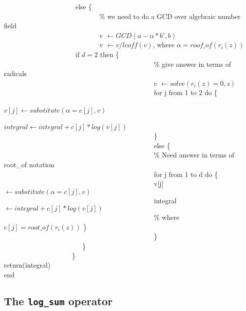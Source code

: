 \begin{flushleft}
~~~~~~~~~~~~~~~~~~~~~else \{ \\
~~~~~~~~~~~~~~~~~~~~~~~~~~~~\%  we need to do a GCD over algebraic number field \\
~~~~~~~~~~~~~~~~~~~~~~~~~~~~v $\leftarrow GCD(a-\alpha*b',b)$ \\
~~~~~~~~~~~~~~~~~~~~~~~~~~~~v $\leftarrow v/lcoff(v) $, \hspace{3 mm}
 where $\alpha=roof\_of(r_{i}(z))$ \\
~~~~~~~~~~~~~~~~~~~~~if $d=2$ then \{ \\
~~~~~~~~~~~~~~~~~~~~~~~~~~~~~~~~~~~~~~~~~~~~\% give answer in terms of radicals  \\
~~~~~~~~~~~~~~~~~~~~~~~~~~~~~~~~~~~~~~~~~~~~c $\leftarrow solve(r_{i}(z)=0,z)$ \\
~~~~~~~~~~~~~~~~~~~~~~~~~~~~~~~~~~~~~~~~~~~~for j from 1 to 2 do \{ \\
~~~~~~~~~~~~~~~~~~~~~~~~~~~~~~~~~~~~~~~~~~~~$v[j] \leftarrow substitute(\alpha=c[j],v)$ \\
~~~~~~~~~~~~~~~~~~~~~~~~~~~~~~~~~~~~~~~~~~~~$integral \leftarrow integral+c[j]*log(v[j])$ \\
~~~~~~~~~~~~~~~~~~~~~~~~~~~~~~~~~~~~~~~~~~~~\} \\
~~~~~~~~~~~~~~~~~~~~~~~~~~~~~~~~~~~~~~~~~~~~else \{ \\
~~~~~~~~~~~~~~~~~~~~~~~~~~~~~~~~~~~~~~~~~~~~\% Need answer in terms of root\_of notation \\
~~~~~~~~~~~~~~~~~~~~~~~~~~~~~~~~~~~~~~~~~~~~for j from 1 to d do \{ \\
~~~~~~~~~~~~~~~~~~~~~~~~~~~~~~~~~~~~~~~~~~~~v[j] $\leftarrow substitute(\alpha=c[j],v)$ \\
~~~~~~~~~~~~~~~~~~~~~~~~~~~~~~~~~~~~~~~~~~~~integral $\leftarrow integral+c[j]*log(v[j])$ \\
~~~~~~~~~~~~~~~~~~~~~~~~~~~~~~~~~~~~~~~~~~~~\% where $c[j]=root\_of(r_{i}(z))$ \} \\
~~~~~~~~~~~~~~~~~~~~~~~~~~~~~~~~~~~~~~~~~~~~\} \\
~~~~~~~~~~~~~~~~~~~~~~~\} \\
~~~~~~~~~~~~~~~~~~~~\} \\
return(integral) \\
end
\end{flushleft}

\subsection{The \texttt{log\_sum} operator}

